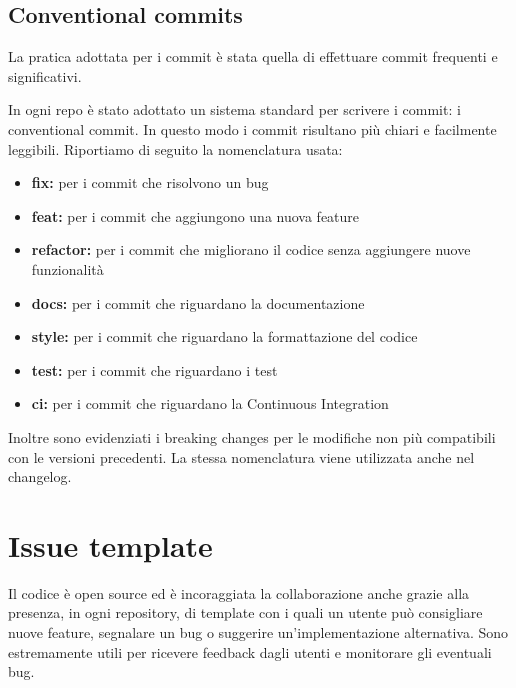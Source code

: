 

\subsection{Conventional commits}
La pratica adottata per i commit è stata quella di effettuare commit frequenti e significativi.

In ogni repo è stato adottato un sistema standard per scrivere i commit:  i conventional commit. In questo modo i commit risultano più chiari e facilmente leggibili. 
Riportiamo di seguito la nomenclatura usata:
\begin{itemize}
    \item \textbf{fix:} per i commit che risolvono un bug
    \item \textbf{feat:} per i commit che aggiungono una nuova feature
    \item \textbf{refactor:} per i commit che migliorano il codice senza aggiungere nuove funzionalità
    \item \textbf{docs:} per i commit che riguardano la documentazione
    \item \textbf{style:} per i commit che riguardano la formattazione del codice
    \item \textbf{test:} per i commit che riguardano i test
    \item \textbf{ci:} per i commit che riguardano la Continuous Integration
\end{itemize}
Inoltre sono evidenziati i breaking changes per le modifiche non più compatibili con le versioni precedenti.
La stessa nomenclatura viene utilizzata anche nel changelog.


\section{Issue template}
Il codice è open source ed è incoraggiata la collaborazione anche grazie alla presenza, in ogni repository, di template con i quali un utente può consigliare nuove feature,
segnalare un bug o suggerire un'implementazione alternativa. Sono estremamente utili per ricevere feedback dagli utenti e monitorare gli eventuali bug.

